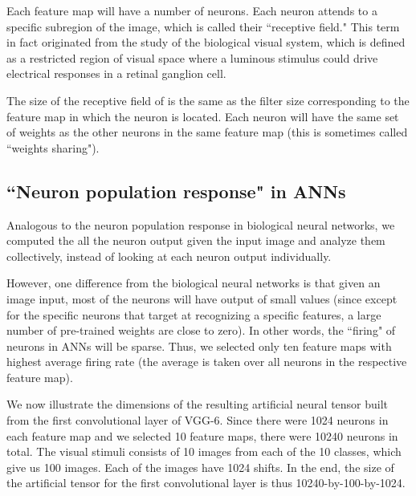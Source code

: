 Each feature map will have a number of neurons. Each neuron attends to a specific subregion of the image, which is called their ``receptive field." This term in fact originated from the study of the biological visual system, which is defined as a restricted region of visual space where a luminous stimulus could drive electrical responses in a retinal ganglion cell.

The size of the receptive field of is the same as the filter size corresponding to the feature map in which the neuron is located. Each neuron will have the same set of weights as the other neurons in the same feature map (this is sometimes called ``weights sharing"). 

 \subsection{``Neuron population response" in ANNs}
Analogous to the neuron population response in biological neural networks, we computed the all the neuron output given the input image and analyze them collectively, instead of looking at each neuron output individually.

However, one difference from the biological neural networks is that given an image input, most of the neurons will have output of small values (since except for the specific neurons that target at recognizing a specific features, a large number of pre-trained weights are close to zero). In other words, the ``firing" of neurons in ANNs will be sparse. Thus, we selected only ten feature maps with highest average firing rate (the average is taken over all neurons in the respective feature map). 

We now illustrate the dimensions of the resulting artificial neural tensor built from the first convolutional layer of VGG-6. Since there were 1024 neurons in each feature map and we selected 10 feature maps, there were 10240 neurons in total. The visual stimuli consists of 10 images from each of the 10 classes, which give us 100 images. Each of the images have 1024 shifts. In the end, the size of the artificial tensor for the first convolutional layer is thus 10240-by-100-by-1024. 

